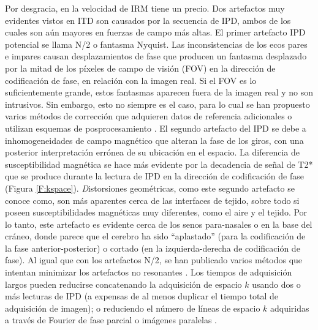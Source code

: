 Por desgracia, en la velocidad de IRM tiene un precio. Dos artefactos muy evidentes vistos en ITD son causados por la secuencia de IPD, ambos de los cuales son aún mayores en fuerzas de campo más altas. El primer artefacto IPD potencial se llama N/2 o fantasma Nyquist. Las inconsistencias de los ecos pares e impares causan desplazamientos de fase que producen un fantasma desplazado por la mitad de los píxeles de campo de visión (FOV) en la dirección de codificación de fase, en relación con la imagen real. Si el FOV es lo suficientemente grande, estos fantasmas aparecen fuera de la imagen real y no son intrusivos. Sin embargo, esto no siempre es el caso, para lo cual se han propuesto varios métodos de corrección que adquieren datos de referencia adicionales \cite{Hu_1996} o utilizan esquemas de posprocesamiento \cite{Zhang_2004}. El segundo artefacto del IPD se debe a inhomogeneidades de campo magnético que alteran la fase de los giros, con una posterior interpretación errónea de su ubicación en el espacio. La diferencia de susceptibilidad magnética se hace más evidente por la decadencia de señal de T2* que se produce durante la lectura de IPD en la dirección de codificación de fase (Figura \ref{F:kspace}). {\emph Distorsiones geométricas}, como este segundo artefacto se conoce como, son más aparentes cerca de las interfaces de tejido, sobre todo si poseen susceptibilidades magnéticas muy diferentes, como el aire y el tejido. Por lo tanto, este artefacto es evidente cerca de los senos para-nasales o en la base del cráneo, donde parece que el cerebro ha sido ``aplastado'' (para la codificación de la fase anterior-posterior) o cortado (en la izquierda-derecha de codificación de fase). Al igual que con los artefactos N/2, se han publicado varios métodos que intentan minimizar los artefactos no resonantes \cite{Weiskopf_2005,Jezzard_1995,Reber_1998}. Los tiempos de adquisición largos pueden reducirse concatenando la adquisición de espacio $k$ usando dos o más lecturas de IPD (a expensas de al menos duplicar el tiempo total de adquisición de imagen); o reduciendo el número de líneas de espacio $k$ adquiridas a través de Fourier de fase parcial o imágenes paralelas \cite{Pruessmann_1999}.

